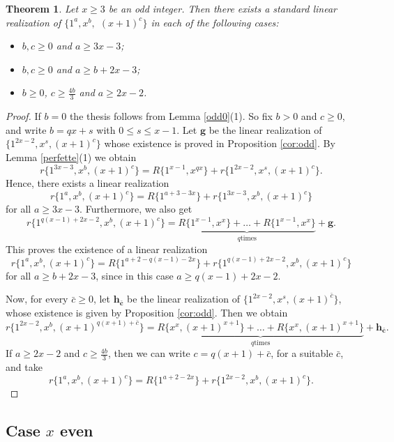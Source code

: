 \documentclass{amsart}
\newtheorem{thm}[prop]{Theorem}
\theoremstyle{definition}
\numberwithin{equation}{section}
\begin{document}
\begin{thm}\label{prop:odd}
Let $x\geq 3$ be an odd integer. Then there exists a standard linear realization of $\{1^a,x^b,$ $(x+1)^c\}$ in each of the
following cases:
\begin{itemize}
\item[(1)] $b,c\geq 0$ and  $a\geq 3x-3$;
\item[(2)] $b,c\geq 0$ and  $a\geq b+2x-3$;
\item[(3)] $b\geq 0$, $c\geq \frac{4b}{3}$ and $a\geq 2x-2$.
\end{itemize}
\end{thm}

\begin{proof}
If $b=0$ the thesis follows from Lemma \ref{odd0}(1). So fix $b>0$ and $c\geq 0$,  and write $b=qx+s$ with $0\leq s\leq x-1$.
Let $\bm{g}$ be the linear realization of $\{1^{2x-2}, x^s, (x+1)^c \}$ whose existence is proved in Proposition
\ref{cor:odd}. By Lemma \ref{perfette}(1) we obtain
$$r\{1^{3x-3},  x^{b}, (x+1)^c \}=R\{1^{x-1}, x^{qx} \} + r\{1^{2x-2}, x^s, (x+1)^c \}.$$
Hence, there exists a linear realization
$$r\{1^{a}, x^{b},(x+1)^c \} =R\{1^{a+3-3x}\}+ r\{1^{3x-3}, x^{b}, (x+1)^c \}$$
for all $a\geq 3x-3$.
Furthermore, we also get
$$r\{1^{q(x-1)+ 2x-2 },  x^{b },(x+1)^c \}=\underbrace{R\{1^{x-1},x^x\} +\ldots+R\{1^{x-1},x^x\}}_{q \textrm{
times}}+\bm{g}.$$
This proves the existence of a linear realization
$$r\{1^{a}, x^{b},(x+1)^c \} =R\{1^{a+2-q(x-1)-2x}\}+ r\{1^{q(x-1)+2x-2}, x^{b},(x+1)^c \}$$
for all $a\geq b+2x-3$, since in this case $a \geq q(x-1)+2x-2$.

Now, for every $\bar c\geq 0$, let $\bm{h_{\bar c}}$ be the linear realization of $\{1^{2x-2}, x^{s}, (x+1)^{\bar c} \}$,
whose
existence is given by Proposition \ref{cor:odd}.
Then we obtain
$$r\{1^{2x-2},x^{b},  (x+1)^{q(x+1)+\bar c} \}=\underbrace{R\{x^x,(x+1)^{x+1}\} +\ldots+R\{x^x,(x+1)^{x+1} \}}_{q
\textrm{
times}}+ \bm{h_{\bar c}}.$$
If $a\geq 2x-2$ and  $c\geq \frac{4b}{3}$, then we can write $c=q(x+1)+\bar c$, for a suitable $\bar c$, and  take
$$r\{1^{a}, x^{b}, (x+1)^c \} =R\{1^{a+2-2x}\}+ r\{1^{2x-2},  x^{b}, (x+1)^c \}.$$
\end{proof}







\subsection{Case $x$ even}\label{sec:xeven}
\end{document}
